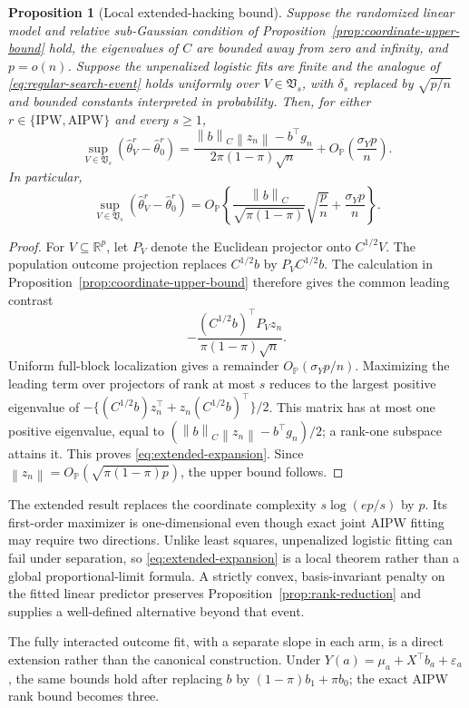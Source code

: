 \documentclass[a4paper,10pt,english]{article}
\newtheorem{proposition}{Proposition}[section]
\newcommand{\Prob}{\mathbb P}
\newcommand{\norm}[1]{\left\lVert #1\right\rVert}
\newcommand{\R}{\mathbb R}
\begin{document}
\begin{proposition}[Local extended-hacking bound]
\label{prop:extended-upper-bound}
Suppose the randomized linear model and relative sub-Gaussian condition of
Proposition~\ref{prop:coordinate-upper-bound} hold, the eigenvalues of $C$
are bounded away from zero and infinity, and $p=o(n)$.  Suppose the
unpenalized logistic fits are finite and the analogue of
\eqref{eq:regular-search-event} holds uniformly over
$V\in\mathfrak V_s$, with $\delta_s$ replaced by $\sqrt{p/n}$ and bounded
constants interpreted in probability.  Then, for either
$r\in\{\mathrm{IPW},\mathrm{AIPW}\}$ and every $s\ge1$,
\begin{equation}\label{eq:extended-expansion}
 \sup_{V\in\mathfrak V_s}
 (\hat\theta_V^r-\hat\theta_0^r)
 =\frac{\norm{b}_C\norm{z_n}-b^\top g_n}
 {2\pi(1-\pi)\sqrt n}
 +O_{\Prob}\left(\frac{\sigma_Yp}{n}\right).
\end{equation}
In particular,
\begin{equation}\label{eq:extended-upper-bound}
 \sup_{V\in\mathfrak V_s}
 (\hat\theta_V^r-\hat\theta_0^r)
 =O_{\Prob}\left\{
 \frac{\norm{b}_C}{\sqrt{\pi(1-\pi)}}\sqrt{\frac pn}
 +\frac{\sigma_Yp}{n}\right\}.
\end{equation}
\end{proposition}

\begin{proof}
For $V\subseteq\R^p$, let $P_V$ denote the Euclidean projector onto
$C^{1/2}V$.  The population outcome projection replaces $C^{1/2}b$ by
$P_VC^{1/2}b$.  The calculation in
Proposition~\ref{prop:coordinate-upper-bound} therefore gives the common
leading contrast
\begin{equation*}
 -\frac{(C^{1/2}b)^\top P_Vz_n}{\pi(1-\pi)\sqrt n}.
\end{equation*}
Uniform full-block localization gives a remainder
$O_{\Prob}(\sigma_Yp/n)$.  Maximizing the leading term over projectors of
rank at most $s$ reduces to the largest positive eigenvalue of
$-\{(C^{1/2}b)z_n^\top+z_n(C^{1/2}b)^\top\}/2$.  This matrix has at most
one positive eigenvalue, equal to
$(\norm{b}_C\norm{z_n}-b^\top g_n)/2$; a rank-one subspace attains it.
This proves \eqref{eq:extended-expansion}.  Since
$\norm{z_n}=O_{\Prob}(\sqrt{\pi(1-\pi)p})$, the upper bound follows.
\end{proof}

The extended result replaces the coordinate complexity
$s\log(ep/s)$ by $p$.  Its first-order maximizer is one-dimensional even
though exact joint AIPW fitting may require two directions.  Unlike
least squares, unpenalized logistic fitting can fail under separation, so
\eqref{eq:extended-expansion} is a local theorem rather than a global
proportional-limit formula.  A strictly convex, basis-invariant penalty on
the fitted linear predictor preserves Proposition~\ref{prop:rank-reduction}
and supplies a well-defined alternative beyond that event.

The fully interacted outcome fit, with a separate slope in each arm, is a
direct extension rather than the canonical construction.  Under
$Y(a)=\mu_a+X^\top b_a+\varepsilon_a$, the same bounds hold after replacing
$b$ by $(1-\pi)b_1+\pi b_0$; the exact AIPW rank bound becomes three.
\end{document}
